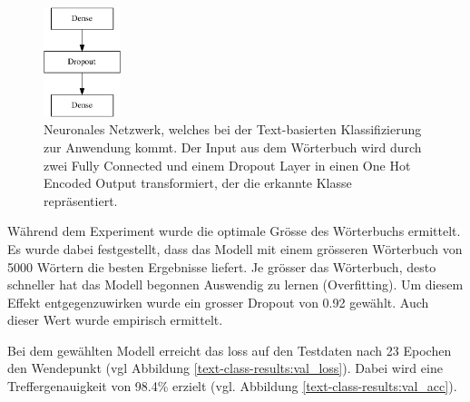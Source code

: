 \begin{figure}[h]
    \caption{Neuronales Netzwerk, welches bei der Text-basierten Klassifizierung zur Anwendung kommt. Der Input aus dem Wörterbuch wird durch zwei Fully Connected und einem Dropout Layer in einen One Hot Encoded Output transformiert, der die erkannte Klasse repräsentiert.}
    \label{text-classification-model}
    \centering
    \includegraphics[width=0.2\textwidth]{graphics/text-classification/model.pdf}
\end{figure} 


Während dem Experiment wurde die optimale Grösse des Wörterbuchs ermittelt. Es wurde dabei festgestellt, dass das Modell mit einem grösseren Wörterbuch von 5000 Wörtern die besten Ergebnisse liefert. Je grösser das Wörterbuch, desto schneller hat das Modell begonnen Auswendig zu lernen (Overfitting). Um diesem Effekt entgegenzuwirken wurde ein grosser Dropout von 0.92 gewählt. Auch dieser Wert wurde empirisch ermittelt.

Bei dem gewählten Modell erreicht das loss auf den Testdaten nach 23 Epochen den Wendepunkt (vgl Abbildung \ref{text-class-results:val_loss}). Dabei wird eine Treffergenauigkeit von 98.4\% erzielt (vgl. Abbildung \ref{text-class-results:val_acc}). 

